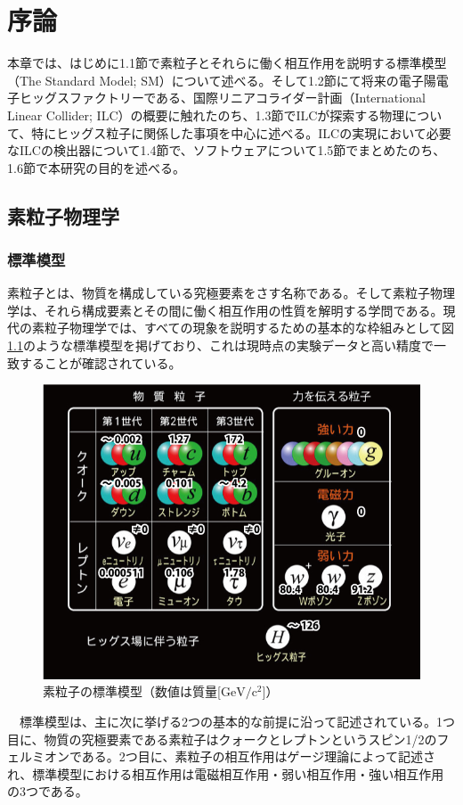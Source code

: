 
\chapter{序論} \label{sec:Intruduction}
本章では、はじめに1.1節で素粒子とそれらに働く相互作用を説明する標準模型（The Standard Model; SM）について述べる。そして1.2節にて将来の電子陽電子ヒッグスファクトリーである、国際リニアコライダー計画（International Linear Collider; ILC）の概要に触れたのち、1.3節でILCが探索する物理について、特にヒッグス粒子に関係した事項を中心に述べる。ILCの実現において必要なILCの検出器について1.4節で、ソフトウェアについて1.5節でまとめたのち、1.6節で本研究の目的を述べる。
\section{素粒子物理学}
\subsection{標準模型}
素粒子とは、物質を構成している究極要素をさす名称である。そして素粒子物理学は、それら構成要素とその間に働く相互作用の性質を解明する学問である。現代の素粒子物理学では、すべての現象を説明するための基本的な枠組みとして図\ref{sm}のような標準模型を掲げており、これは現時点の実験データと高い精度で一致することが確認されている。\\
\begin{figure}[ht]
	\begin{center}
 \includegraphics[keepaspectratio, scale=0.4]
 	{Figure/Introduction/sm.jpg}
 		\caption[素粒子標準模型]{素粒子の標準模型（数値は質量[$\mathrm{GeV/c^2}$]）}
 		\label{sm}
	\end{center}
\end{figure}
　標準模型は、主に次に挙げる2つの基本的な前提に沿って記述されている。1つ目に、物質の究極要素である素粒子はクォークとレプトンというスピン1/2のフェルミオンである。2つ目に、素粒子の相互作用はゲージ理論によって記述され、標準模型における相互作用は電磁相互作用・弱い相互作用・強い相互作用の3つである。

